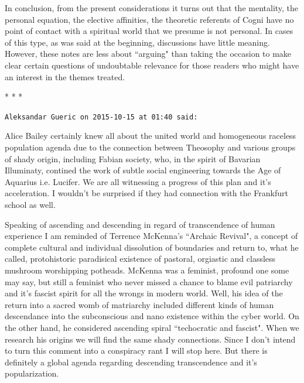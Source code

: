 In conclusion, from the present considerations it turns out that the mentality, the personal equation, the elective
affinities, the theoretic referents of Cogni have no point of contact with a spiritual world that we presume is not
personal. In cases of this type, as was said at the beginning, discussions have little meaning. However, these notes
are less about ``arguing" than taking the occasion to make clear certain questions of undoubtable relevance for those
readers who might have an interest in the themes treated.



\begin{center}* * *\end{center}

\begin{footnotesize}\begin{sffamily}



\texttt{Aleksandar Gueric on 2015-10-15 at 01:40 said: }

Alice Bailey certainly knew all about the united world and homogeneous raceless population agenda due to the connection between Theosophy and various groups of shady origin, including Fabian society, who, in the spirit of Bavarian Illuminaty, contined the work of subtle social engineering towards the Age of Aquarius i.e. Lucifer. We are all witnessing a progress of this plan and it's acceleration. I wouldn't be surprised if they had connection with the Frankfurt school as well.

Speaking of ascending and descending in regard of transcendence of human experience I am reminded of Terrence McKenna's ``Archaic Revival", a concept of complete cultural and individual dissolution of boundaries and return to, what he called, protohistoric paradisical existence of pastoral, orgiastic and classless mushroom worshipping potheads. McKenna was a feminist, profound one some may say, but still a feminist who never missed a chance to blame evil patriarchy and it's fascist spirit for all the wrongs in modern world. Well, his idea of the return into a sacred womb of matriarchy included different kinds of human descendance into the subconscious and nano existence within the cyber world. On the other hand, he considered ascending spiral ``techocratic and fascist". When we research his origins we will find the same shady connections. Since I don't intend to turn this comment into a conspiracy rant I will stop here. But there is definitely a global agenda regarding descending transcendence and it's popularization.


\end{sffamily}
\end{footnotesize}
